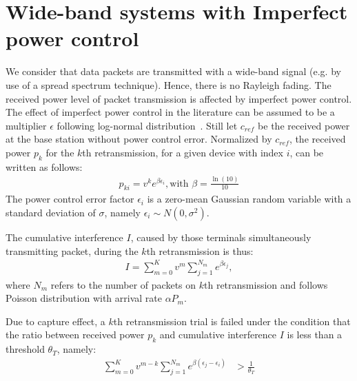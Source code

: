 \section{Wide-band systems with Imperfect power control}
\label{sec:imperfect-power-control}
 We consider that data packets are transmitted with a wide-band signal (e.g. by use of a spread spectrum technique). Hence, there is no Rayleigh fading. The received power level of packet transmission is affected by imperfect power control. The effect of imperfect power control in the literature can be assumed to be a multiplier $\epsilon$ following log-normal distribution~\cite{Lee:1992:MCD:530392}. Still let $c_{ref}$ be the received power at the base station without power control error. Normalized by $c_{ref}$, the received power $p_k$ for the $k$th retransmission, for a given device with index $i$, can be written as follows:
\begin{align*}
p_{ki} = v^k e^{\beta \epsilon_i}, \text{with } \beta = \frac{\ln(10)}{10}
\end{align*}
The power control error factor $\epsilon_i$ is a zero-mean Gaussian random variable with a standard deviation of $\sigma$, namely $\epsilon_i \sim N\left( 0, \sigma^2\right)$. 

The cumulative interference $I$, caused by those terminals simultaneously transmitting packet,  during the $k$th retransmission is thus:
\begin{align*}
I = \sum_{m=0}^{K} v^{m}\sum_{j=1}^{N_m} e^{\beta \epsilon_j},
\end{align*}
where $N_m$ refers to the number of packets on $k$th retransmission and follows Poisson distribution with arrival rate $\alpha P_m$. 

Due to capture effect, a $k$th retransmission trial is failed under the condition that the ratio between received power $p_k$ and cumulative interference $I$ is less than a threshold $\theta_{T}$, namely:
\begin{align*}
\sum_{m=0}^{K} v^{m-k}\sum_{j=1}^{N_m} e^{\beta \left( \epsilon_j - \epsilon_i \right) } &> \frac{1}{\theta_{T}}
\end{align*}

